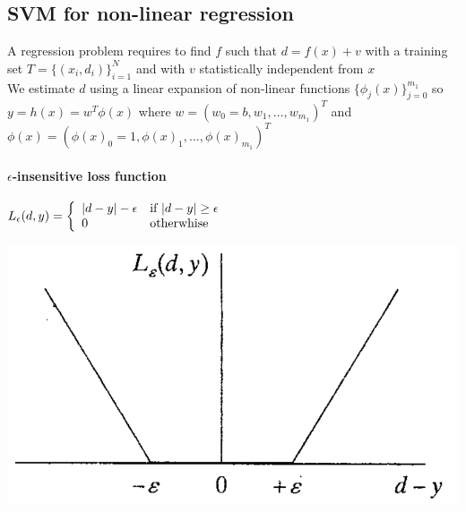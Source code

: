 \documentclass[10pt]{report}
\begin{document}
\subsection{SVM for non-linear regression}
A regression problem requires to find $f$ such that $d=f(x)+v$ with a training set $T=\{(x_i,d_i)\}_{i=1}^N$ and with $v$ statistically independent from $x$\\
We estimate $d$ using a linear expansion of non-linear functions $\{\phi_j(x)\}_{j=0}^{m_1}$ so $y=h(x) = w^T\phi(x)$ where $w = (w_0 = b, w_1,\ldots,w_{m_1})^T$ and $\phi(x) = (\phi(x)_0 = 1, \phi(x)_1,\ldots, \phi(x)_{m_1})^T$
\paragraph{$\epsilon$-insensitive loss function} $L_\epsilon(d,y) = \left\{\begin{array}{l l}
|d - y| - \epsilon & \hbox{if }|d-y|\geq\epsilon\\
0 & \hbox{otherwhise}
\end{array} \right.$
\begin{center}
	\includegraphics[scale=0.5]{22.png}
\end{center}
\end{document}
